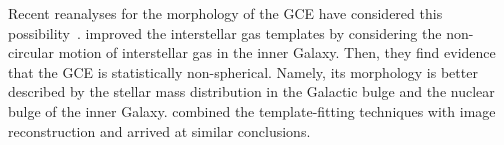 \documentclass[doublespace,nopageskip]{VTthesis}
\newcommand{\mrm}[1]{\mathrm{#1}}
\begin{document}
Recent reanalyses for the morphology of the GCE have considered this possibility~\citep{2018NatAs...2..387M,2018NatAs...2..819B,2019JCAP...09..042M, 2020PhRvD.102d3012A}.  \citet{2018NatAs...2..387M} {improved the interstellar gas templates by considering the non-circular motion of interstellar gas in the inner Galaxy}. Then, they find evidence that the GCE is statistically non-spherical. Namely, its morphology is better described by the stellar mass distribution in the Galactic bulge and the nuclear bulge of the inner Galaxy. \citet{2018NatAs...2..819B} combined the template-fitting techniques with image reconstruction and arrived at similar conclusions.





\end{document}
